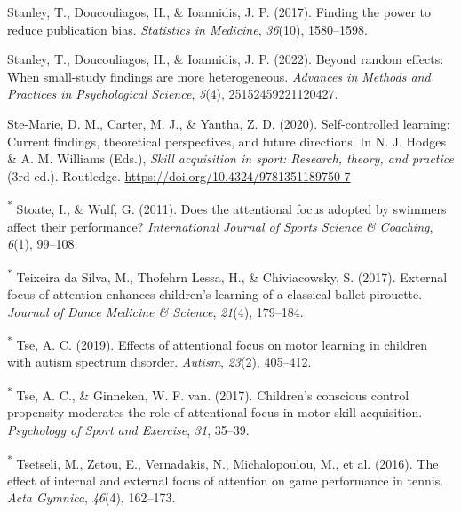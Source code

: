 \documentclass[
  man, donotrepeattitle,floatsintext]{apa7}
\newlength{\cslhangindent}
\newlength{\cslentryspacingunit} %
\newenvironment{CSLReferences}[2] %
 {%
  \setlength{\parindent}{0pt}
  \ifodd #1
  \let\oldpar\par
  \def\par{\hangindent=\cslhangindent\oldpar}
  \fi
  \setlength{\parskip}{#2\cslentryspacingunit}
 }%
 {}
\begin{document}
\begin{CSLReferences}{1}{0}
\leavevmode{}%
Stanley, T., Doucouliagos, H., \& Ioannidis, J. P. (2017). Finding the power to reduce publication bias. \emph{Statistics in Medicine}, \emph{36}(10), 1580--1598.

\leavevmode{}%
Stanley, T., Doucouliagos, H., \& Ioannidis, J. P. (2022). Beyond random effects: When small-study findings are more heterogeneous. \emph{Advances in Methods and Practices in Psychological Science}, \emph{5}(4), 25152459221120427.

\leavevmode{}%
Ste-Marie, D. M., Carter, M. J., \& Yantha, Z. D. (2020). Self-controlled learning: {Current} findings, theoretical perspectives, and future directions. In N. J. Hodges \& A. M. Williams (Eds.), \emph{Skill acquisition in sport: {Research}, theory, and practice} (3rd ed.). Routledge. \url{https://doi.org/10.4324/9781351189750-7}

\leavevmode{}%
\textsuperscript{*} Stoate, I., \& Wulf, G. (2011). Does the attentional focus adopted by swimmers affect their performance? \emph{International Journal of Sports Science \& Coaching}, \emph{6}(1), 99--108.

\leavevmode{}%
\textsuperscript{*} Teixeira da Silva, M., Thofehrn Lessa, H., \& Chiviacowsky, S. (2017). External focus of attention enhances children's learning of a classical ballet pirouette. \emph{Journal of Dance Medicine \& Science}, \emph{21}(4), 179--184.

\leavevmode{}%
\textsuperscript{*} Tse, A. C. (2019). Effects of attentional focus on motor learning in children with autism spectrum disorder. \emph{Autism}, \emph{23}(2), 405--412.

\leavevmode{}%
\textsuperscript{*} Tse, A. C., \& Ginneken, W. F. van. (2017). Children's conscious control propensity moderates the role of attentional focus in motor skill acquisition. \emph{Psychology of Sport and Exercise}, \emph{31}, 35--39.

\leavevmode{}%
\textsuperscript{*} Tsetseli, M., Zetou, E., Vernadakis, N., Michalopoulou, M., et al. (2016). The effect of internal and external focus of attention on game performance in tennis. \emph{Acta Gymnica}, \emph{46}(4), 162--173.


\end{CSLReferences}
\end{document}
